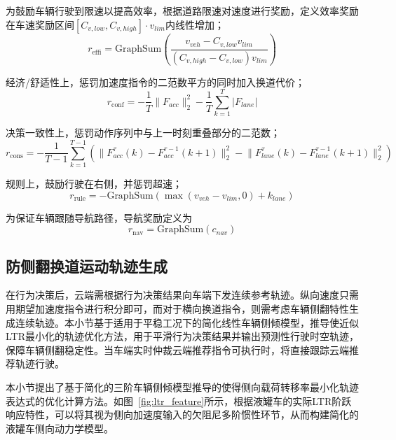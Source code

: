       为鼓励车辆行驶到限速以提高效率，根据道路限速对速度进行奖励，定义效率奖励在车速奖励区间$[C_{v,low},C_{v,high}]\cdot v_{lim}$内线性增加；
      \begin{equation}
        r_{\text{effi}} = \text{GraphSum}\left(\frac{v_{veh}-C_{v,low}v_{lim}}{(C_{v,high}-C_{v,low})v_{lim}}\right) 
      \label{eq:effi_reward}
      \end{equation}

      经济/舒适性上，惩罚加速度指令的二范数平方的同时加入换道代价；
      \begin{equation}
        r_{\text{conf}} = - \frac{1}{T} \lVert F_{acc} \rVert^2_2 - \frac{1}{T} \sum_{k=1}^{T} |F_{lane}|
      \label{eq:conf_reward}
      \end{equation}

      决策一致性上，惩罚动作序列中与上一时刻重叠部分的二范数；
      \begin{equation}
        r_{\text{cons}} = - \frac{1}{T-1} \sum_{k=1}^{T-1} \left(\lVert F_{acc}^{\tau}(k) - F_{acc}^{\tau-1}(k+1)\rVert^2_2 - \lVert F_{lane}^{\tau}(k) - F_{lane}^{\tau-1}(k+1)\rVert^2_2\right) 
      \end{equation}
      
      规则上，鼓励行驶在右侧，并惩罚超速；
      \begin{equation}
        r_{\text{rule}} = - \text{GraphSum}\left(\max(v_{veh} - v_{lim},0) + k_{lane} \right) 
        \label{eq:rule_reward}
      \end{equation}

      为保证车辆跟随导航路径，导航奖励定义为
      \begin{equation}
        r_{\text{nav}} = \text{GraphSum}\left(c_{nav}\right) 
        \label{eq:nav_reward}
      \end{equation}
      
  \subsection{防侧翻换道运动轨迹生成}
  \label{subsection:antirollover_traj_gen_cloud}
    在行为决策后，云端需根据行为决策结果向车端下发连续参考轨迹。纵向速度只需用期望加速度指令进行积分即可，而对于横向换道指令，则需考虑车辆侧翻特性生成连续轨迹。本小节基于适用于平稳工况下的简化线性车辆侧倾模型，推导使近似LTR最小化的轨迹优化方法，用于平滑行为决策结果并输出预测性行驶时空轨迹，保障车辆侧翻稳定性。当车端实时仲裁云端推荐指令可执行时，将直接跟踪云端推荐轨迹行驶。


    本小节提出了基于简化的三阶车辆侧倾模型推导的使得侧向载荷转移率最小化轨迹表达式的优化计算方法。如图~\ref{fig:ltr_feature}所示，根据液罐车的实际LTR阶跃响应特性，可以将其视为侧向加速度输入的欠阻尼多阶惯性环节，从而构建简化的液罐车侧向动力学模型。
    
